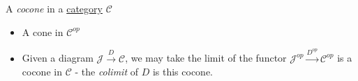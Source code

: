 A \emph{cocone} in a \hyperref[D3.6]{category} $\mathcal{C}$

\begin{itemize}
    \item  A cone in $\mathcal{C}^{op}$
    \item Given a diagram $\mathcal{J}\xrightarrow{D}\mathcal{C}$, we may take the limit of the functor $\mathcal{J}^{op}\xrightarrow{D^{op}}\mathcal{C}^{op}$ is a cocone in $\mathcal{C}$ - the \emph{colimit} of $D$ is this cocone.
  \end{itemize}
